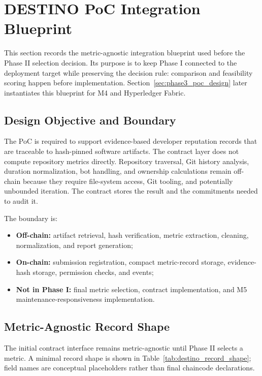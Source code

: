 \section{DESTINO PoC Integration Blueprint}
\label{sec:detailed_design_blueprint}

This section records the metric-agnostic integration blueprint used before the Phase II selection decision. Its purpose is to
keep Phase I connected to the deployment target while preserving the decision rule: comparison and feasibility scoring happen
before implementation. Section~\ref{sec:phase3_poc_design} later instantiates this blueprint for M4 and Hyperledger Fabric.

\subsection{Design Objective and Boundary}
\label{sec:design_objective_boundary}

The PoC is required to support evidence-based developer reputation records that are traceable to hash-pinned software artifacts.
The contract layer does not compute repository metrics directly. Repository traversal, Git history analysis, duration
normalization, bot handling, and ownership calculations remain off-chain because they require file-system access, Git tooling,
and potentially unbounded iteration. The contract stores the result and the commitments needed to audit it.

The boundary is:
\begin{itemize}[leftmargin=*]
  \item \textbf{Off-chain:} artifact retrieval, hash verification, metric extraction, cleaning, normalization, and report generation;
  \item \textbf{On-chain:} submission registration, compact metric-record storage, evidence-hash storage, permission checks, and events;
  \item \textbf{Not in Phase I:} final metric selection, contract implementation, and M5 maintenance-responsiveness implementation.
\end{itemize}

\subsection{Metric-Agnostic Record Shape}
\label{sec:design_record_shape}

The initial contract interface remains metric-agnostic until Phase II selects a metric. A minimal record shape is shown in
Table~\ref{tab:destino_record_shape}; field names are conceptual placeholders rather than final chaincode declarations.

